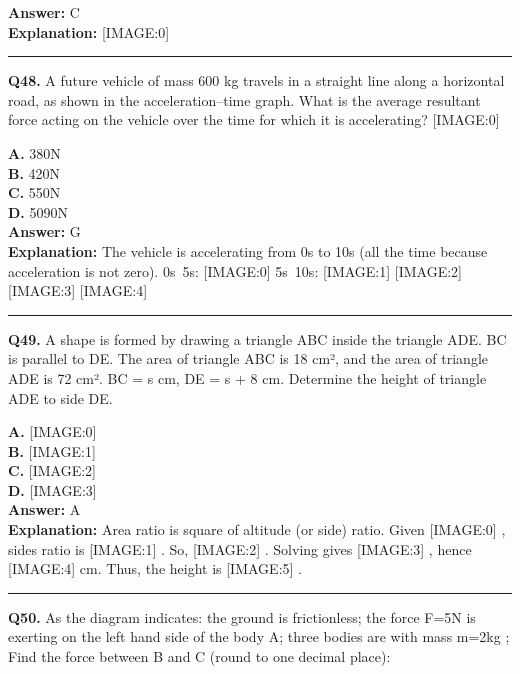 \documentclass[12pt]{article}
\begin{document}
\textbf{Answer:} C \\
\textbf{Explanation:} [IMAGE:0]

\hrule
\vspace{1em}


\noindent
\textbf{Q48.} A future vehicle of mass 600 kg travels in a straight line along a horizontal road, as shown in the acceleration–time graph.
What is the average resultant force acting on the vehicle over the time for which it is accelerating?
[IMAGE:0]



\textbf{A.} 380N \\
\textbf{B.} 420N \\
\textbf{C.} 550N \\
\textbf{D.} 5090N \\

\textbf{Answer:} G \\
\textbf{Explanation:} The vehicle is accelerating from 0s to 10s (all the time because acceleration is not zero).
0s~5s:
[IMAGE:0]
5s~10s:
[IMAGE:1]
[IMAGE:2]
[IMAGE:3]
[IMAGE:4]

\hrule
\vspace{1em}


\noindent
\textbf{Q49.} A shape is formed by drawing a triangle ABC inside the triangle ADE. BC is parallel to DE. The area of triangle ABC is 18 cm², and the area of triangle ADE is 72 cm². BC = s cm, DE = s + 8 cm.
Determine the height of triangle ADE to side DE.



\textbf{A.} [IMAGE:0] \\
\textbf{B.} [IMAGE:1] \\
\textbf{C.} [IMAGE:2] \\
\textbf{D.} [IMAGE:3] \\

\textbf{Answer:} A \\
\textbf{Explanation:} Area ratio is square of altitude (or side) ratio. Given
[IMAGE:0]
, sides ratio is
[IMAGE:1]
. So,
[IMAGE:2]
. Solving gives
[IMAGE:3]
, hence
[IMAGE:4]
cm. Thus, the height is
[IMAGE:5]
.

\hrule
\vspace{1em}


\noindent
\textbf{Q50.} As the diagram indicates: the ground is frictionless; the force F=5N
is exerting on the left hand side of the body A; three bodies are with mass m=2kg
; Find the force between B and C (round to one decimal place):
\end{document}
